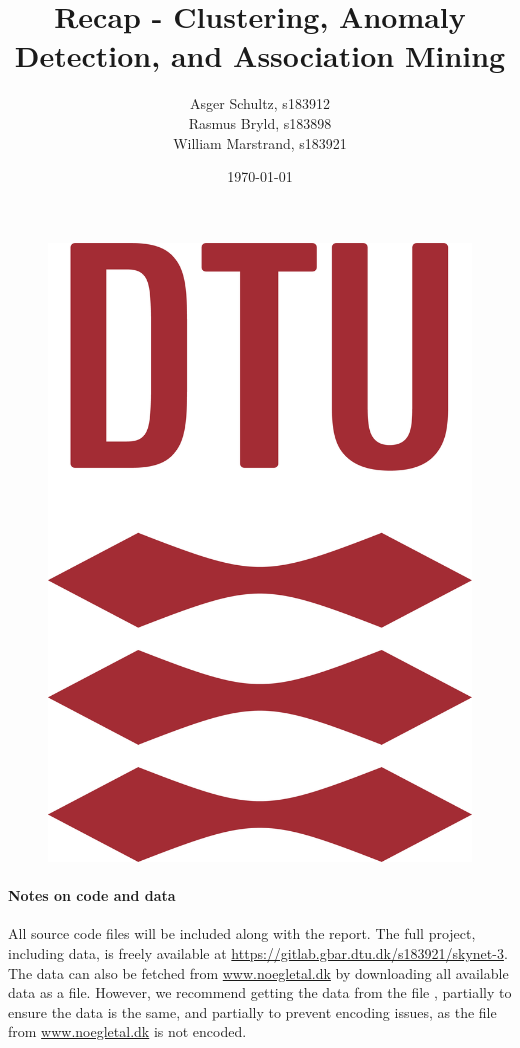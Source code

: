 \documentclass[11pt,fleqn]{article}
\title{Recap - Clustering, Anomaly Detection, and Association Mining}
\author{Asger Schultz, s183912\\
	Rasmus Bryld, s183898\\
	William Marstrand, s183921}
\date{\today}
\numberwithin{footnote}{section}
\numberwithin{figure}{section}
\numberwithin{table}{section}
\begin{document}
\maketitle
\begin{figure}[H]
	\centering
	\includegraphics[width=(\textwidth/2)]{DTU_logo}
\end{figure}
\thispagestyle{empty}
\clearpage

\tableofcontents
\thispagestyle{empty}

\paragraph{Notes on code and data} All source code files will be included along with the report. The full project, including data, is freely available at \url{https://gitlab.gbar.dtu.dk/s183921/skynet-3}. The data can also be fetched from \url{www.noegletal.dk} by downloading all available data as a  file. However, we recommend getting the data from the file , partially to ensure the data is the same, and partially to prevent encoding issues, as the  file from \url{www.noegletal.dk} is not  encoded.
\end{document}
